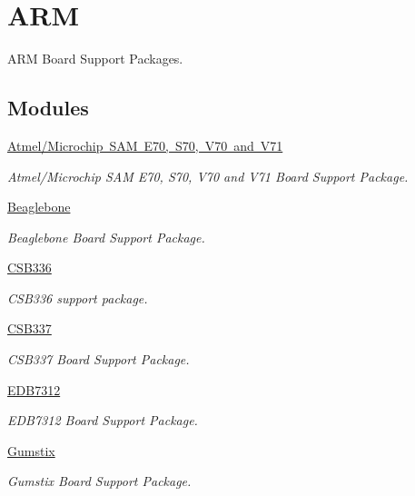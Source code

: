 \hypertarget{group__RTEMSBSPsARM}{}\section{A\+RM}
\label{group__RTEMSBSPsARM}


A\+RM Board Support Packages.  


\subsection*{Modules}
\begin{DoxyCompactItemize}
\item 
\mbox{\hyperlink{group__RTEMSBSPsARMAtsam}{Atmel/\+Microchip S\+A\+M E70, S70, V70 and V71}}
\begin{DoxyCompactList}\small\item\em Atmel/\+Microchip S\+AM E70, S70, V70 and V71 Board Support Package. \end{DoxyCompactList}\item 
\mbox{\hyperlink{group__RTEMSBSPsARMBeagle}{Beaglebone}}
\begin{DoxyCompactList}\small\item\em Beaglebone Board Support Package. \end{DoxyCompactList}\item 
\mbox{\hyperlink{group__RTEMSBSPsARMCSB336}{C\+S\+B336}}
\begin{DoxyCompactList}\small\item\em C\+S\+B336 support package. \end{DoxyCompactList}\item 
\mbox{\hyperlink{group__RTEMSBSPsARMCSB337}{C\+S\+B337}}
\begin{DoxyCompactList}\small\item\em C\+S\+B337 Board Support Package. \end{DoxyCompactList}\item 
\mbox{\hyperlink{group__RTEMSBSPsARMEDB7312}{E\+D\+B7312}}
\begin{DoxyCompactList}\small\item\em E\+D\+B7312 Board Support Package. \end{DoxyCompactList}\item 
\mbox{\hyperlink{group__RTEMSBSPsARMGumstix}{Gumstix}}
\begin{DoxyCompactList}\small\item\em Gumstix Board Support Package. \end{DoxyCompactList}\item 

\end{DoxyCompactItemize}
